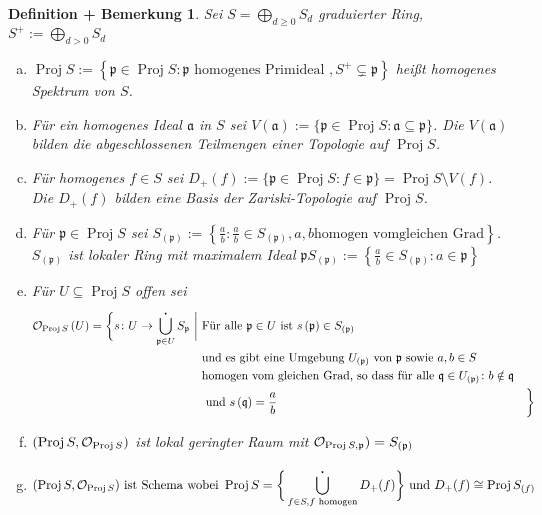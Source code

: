 \documentclass[a4paper,oneside]{scrbook}
\theoremstyle{break}
\newtheorem{DefBem}[Def]{Definition + Bemerkung}
\theoremstyle{nonumberbreak}
\theoremstyle{nonumberplain}
\theoremstyle{break}
\newcommand{\Proj}{%
	\ensuremath{\operatorname{Proj}}%
}
\begin{document}
\begin{DefBem}
	Sei $S = \bigoplus_{d \geq 0} S_d$ graduierter Ring, $S^+:=\bigoplus_{d > 0} S_d$
	\begin{enumerate}[(a)]
		\item  $\Proj S := \left\lbrace \mathfrak{p} \in \Proj S: \mathfrak{p} \text{ homogenes Primideal }, S^+ \subsetneq \mathfrak{p} \right\rbrace $ heißt \emph{homogenes Spektrum} von $S$.
		\item Für ein homogenes Ideal $\mathfrak a$ in $S$ sei $V(\mathfrak{a}) := \{\mathfrak{p} \in \Proj S : \mathfrak{a \subseteq p} \}$. Die $V(\mathfrak{a})$ bilden die abgeschlossenen Teilmengen einer Topologie auf $\Proj S$.
		\item Für homogenes $f \in S$ sei $D_+(f):=\{\mathfrak{p} \in \Proj S : f \in \mathfrak p\} = \Proj S \setminus V(f)$. Die $D_+(f)$ bilden eine Basis der Zariski-Topologie auf $\Proj S$.
		\item Für $\mathfrak{p} \in \Proj S$ sei $S_{(\mathfrak{p})}:= \left\lbrace \frac{a}{b}:\frac{a}{b} \in S_{(\mathfrak{p})},a,b \text{homogen vomgleichen Grad}  \right\rbrace $. $S_{(\mathfrak{p})}$ ist lokaler Ring mit maximalem Ideal $\mathfrak{p}S_{(\mathfrak{p})} := \left\lbrace \frac{a}{b} \in S_{(\mathfrak{p})} : a \in \mathfrak{p} \right\rbrace $
		\item  Für $U \subseteq \Proj S$ offen sei 
			\begin{align*}
			\mathcal{O}_{\Proj S}\left(U\right) = 
				\bigg\{ s\colon U \to \bigcup_{ \mathfrak{p} \in U }^{\centerdot} S_{\mathfrak{p}}\ \bigg|\
					& \text{Für alle } \mathfrak{p} \in U \text{ ist } s\left(\mathfrak{p}\right) \in S_{(\mathfrak{p})}\\
					& \text{und es gibt eine Umgebung } U_{(\mathfrak{p})} \text{ von } \mathfrak{p}
					\text{ sowie } a,b \in S \\ 
					& \text{homogen vom gleichen Grad, so dass für alle } \mathfrak{q} \in U_{(\mathfrak{p})}\colon b \notin \mathfrak{q} \\
					& \text{ und } s\left(\mathfrak{q}\right) = \frac{a}{b}
					& \bigg\}
		\end{align*}
		\item $(\Proj S, \mathcal{O}_{\Proj S})$ ist lokal geringter Raum mit $\mathcal{O}_{\Proj S, \mathfrak{p}}) = S_{(\mathfrak p)}$
		\item \begin{align*} (\Proj S, \mathcal{O}_{\Proj S})  \text{ ist Schema wobei } \Proj S = \bigg\{\bigcup^{\centerdot}_{ f  \in S, f \text{ homogen} }D_+(f) \bigg\} \text{ und }D_+(f) \cong \Proj S_{(f)}
		       \end{align*}

	\end{enumerate}
\end{DefBem}
\end{document}
